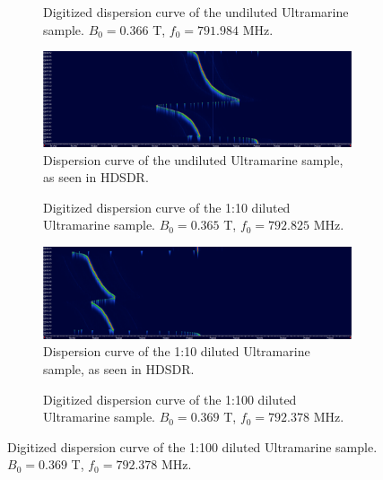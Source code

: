 \documentclass{article}
\begin{document}
\begin{figure}[h]
	\centering
	\begin{subfigure}[t]{0.45\textwidth}
		\centering
		\scalebox{0.44}{}
		\caption{Digitized dispersion curve of the undiluted Ultramarine sample. $B_0 = 0.366$ T, $f_0 = 791.984$ MHz.}
		\label{fig:Ultramarine1Digitized}
	\end{subfigure}
	\hfill
	\begin{subfigure}[t]{0.45\textwidth}
		\centering
		\includegraphics[width=\textwidth]{Figures/Task 5/Ultramarine.png}
		\caption{Dispersion curve of the undiluted Ultramarine sample, as seen in HDSDR.}
		\label{fig:Ultramarine1}
	\end{subfigure}
	\hfill
	\begin{subfigure}[t]{0.45\textwidth}
		\centering
		\scalebox{0.44}{}
		\caption{Digitized dispersion curve of the 1:10 diluted Ultramarine sample. $B_0 = 0.365$ T, $f_0 = 792.825$ MHz.}
		\label{fig:Ultramarine10Digitized}
	\end{subfigure}
	\hfill
	\begin{subfigure}[t]{0.45\textwidth}
		\centering
		\includegraphics[width=\textwidth]{Figures/Task 5/Ultramarine10.png}
		\caption{Dispersion curve of the 1:10 diluted Ultramarine sample, as seen in HDSDR.}
		\label{fig:Ultramarine10}
	\end{subfigure}
	\hfill
	\begin{subfigure}[t]{0.45\textwidth}
		\centering
		\scalebox{0.44}{}
		\caption{Digitized dispersion curve of the 1:100 diluted Ultramarine sample. $B_0 = 0.369$ T, $f_0 = 792.378$ MHz.}

\end{subfigure}
\end{figure}
\end{document}
